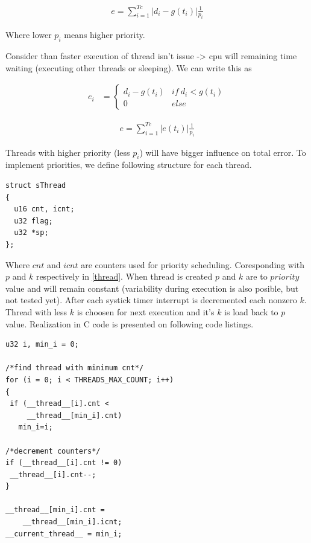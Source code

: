 \documentclass[conference]{IEEEtran}
\begin{document}
\begin{align}
e = \sum_{i=1}^{Tc} |d_i - g(t_i)|\frac{1}{p_i}
\end{align}

Where lower $p_i$ means higher priority.

Consider than faster execution of thread isn't issue -> cpu will remaining time waiting (executing other threads or sleeping). We can write this as

\begin{align}
	 e_i &=				
	  \begin{cases}			
	   d_i - g(t_i) & if\ d_i < g(t_i) \\
	   0       & else
	  \end{cases}
\end{align}

\begin{align}
\label{error_eq}
e = \sum_{i=1}^{Tc} |e(t_i)|\frac{1}{p_i}
\end{align}

Threads with higher priority (less $p_i$) will have bigger influence on total error. To implement priorities, we define following structure for each thread.
\noindent\begin{minipage}{.45\textwidth}
\lstset{language=C++}    
\begin{lstlisting}[frame=single, caption = thread structure]
struct sThread
{
  u16 cnt, icnt;
  u32 flag; 
  u32 *sp;
};
\end{lstlisting}
\end{minipage}\hfill

Where
$cnt$ and $icnt$ are counters used for priority scheduling. Coresponding with $p$ and $k$ respectively in \ref{thread}.
When thread is created $p$ and $k$ are to $priority$ value and will remain constant (variability during execution is also posible, but not tested yet).
After each systick timer interrupt is decremented each nonzero $k$. Thread with less $k$ is choosen for next execution and it's $k$ is load back to $p$ value.
Realization in C code is presented on following code listings.

\noindent\begin{minipage}{.45\textwidth}
\lstset{language=C++}    
\begin{lstlisting}[frame=single, caption = priority scheduler]
u32 i, min_i = 0;

/*find thread with minimum cnt*/
for (i = 0; i < THREADS_MAX_COUNT; i++) 
{
 if (__thread__[i].cnt < 
     __thread__[min_i].cnt) 
   min_i=i;

/*decrement counters*/
if (__thread__[i].cnt != 0)
 __thread__[i].cnt--;
}

__thread__[min_i].cnt = 
	__thread__[min_i].icnt;
__current_thread__ = min_i;
\end{lstlisting}
\end{minipage}\hfill
\end{document}
